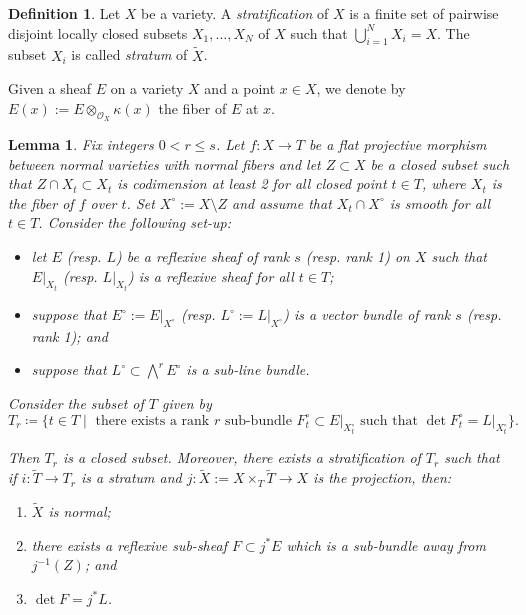 \documentclass[12pt]{amsart}
\numberwithin{equation}{section}
\newtheorem{lem}[thm]{Lemma}
\theoremstyle{definition}
\newtheorem{defn}[thm]{Definition}
\theoremstyle{definition}
\theoremstyle{definition}
\begin{document}
\begin{defn}
Let $X$ be a variety. A \emph{stratification} of $X$ is a finite set of pairwise disjoint locally closed subsets $X_1,\dots,X_N$ of $X$ such that $\bigcup_{i=1}^N X_i=X$. The subset $X_i$ is called  \emph{stratum} of $\tilde X$.
\end{defn}

Given a sheaf $E$ on a variety $X$ and a point $x\in X$, we denote by $E(x) := E \otimes_{\mathcal O_X} \kappa(x)$ the fiber of $E$ at $x$.

\begin{lem}
\label{lem_reconstruction}
Fix integers $0<r \leq s$. Let $f\colon X \to T$ be a flat projective morphism between normal varieties with normal fibers and let $Z \subset X$ be a closed subset 
such that $Z \cap X_t \subset X_t$ is codimension at least 2 for all closed point $t \in T$, where $X_t$ is the fiber of $f$ over $t$.  Set $X^\circ := X \setminus Z$ and assume that $X_t\cap X^\circ$ is smooth for all $t\in T$.  
Consider the following set-up:
\begin{itemize}
\item let $E$ (resp. $L$) be a reflexive sheaf of rank $s$
(resp. rank 1) on $X$ such that $E\vert_{X_t}$ (resp. $L\vert_{X_t}$) is a reflexive sheaf for all $t \in T$; 

\item suppose that  $E^\circ := E\vert_{X^\circ}$ (resp. 
$L^\circ := L\vert_{X^\circ}$) is a vector bundle of rank $s$ (resp. rank 1); and 
\item suppose that $L^\circ \subset \bigwedge^{r}E^\circ$ is a sub-line bundle.
\end{itemize} 
Consider the subset of $T$ given by 
\[T_r\coloneqq \{ t \in T \mid \text{ there exists a rank $r$ sub-bundle }  F^\circ_t \subset E\vert_{X^\circ_t} \text{ such that } 
\det F^\circ_t = L\vert_{X^\circ_t}\}.\]

Then $T_r$ is a closed subset.  Moreover, 
there exists a stratification of $T_r$ such that if $i\colon \tilde{T} \to T_r$ is a stratum and
$j\colon \tilde{X} := X\times_T\tilde{T} \to X$ is the  projection, then: 
\begin{enumerate}
    \item $\tilde{X}$ is normal; 
    \item there exists a reflexive sub-sheaf
$F \subset j^*E$ which is a sub-bundle away from $j^{-1}(Z)$; and 
\item $\det F = j^*L$.
\end{enumerate}
\end{lem}
\end{document}
